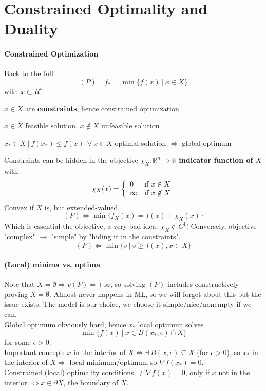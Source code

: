 \documentclass[10pt]{report}
\begin{document}
\section{Constrained Optimality and Duality}
\paragraph{Constrained Optimization} Back to the full $$(P)\:\:\:\:\:f_* = \min\{f(x)\:|\:x\in X\}$$ with $x\subset R^n$\begin{list}{}{}
	\item $x\in X$ are \textbf{constraints}, hence constrained optimization
	\item $x\in X$ feasible solution, $x\not\in X$ unfeasible solution
	\item $x_*\in X\:|\:f(x_*)\leq f(x)\:\:\forall\:x\in X$ optimal solution $\Leftrightarrow$ global optimum
\end{list}
Constraints can be hidden in the objective $\chi_X : \mathbb{R}^n\rightarrow \overline{\mathbb{R}}$ \textbf{indicator function of $X$} with $$\chi_X(x)=\left\{\begin{array}{l l}
0&\text{if }x\in X\\
\infty&\text{if }x\not\in X
\end{array}\right.$$ Convex if $X$ is, but extended-valued.
$$(P)\Leftrightarrow \min\{f_X(x)=f(x)+\chi_X(x)\}$$ Which is essential the objective, a very bad idea: $\chi_X\not\in C^1$! Conversely, objective "complex" $\rightarrow$ "simple" by "hiding it in the constraints".
$$(P)\Leftrightarrow\min\{v\:|\:v\geq f(x), x\in X\}$$
\paragraph{(Local) minima vs. optima} Note that $X=\emptyset\Rightarrow v(P) = +\infty$, so solving $(P)$ includes constructively proving $X=\emptyset$. Almost never happens in ML, so we will forget about this but the issue exists. The model is our choice, we choose it simple/nice/nonempty if we can.\\
Global optimum obviously hard, hence $x_*$ local optimum solves $$\min\{f(x)\:|\:x\in B(x_*,\epsilon)\cap X\}$$ for some $\epsilon>0$.\\
Important concept: $x$ in the interior of $X\Leftrightarrow\exists\:B(x,\epsilon)\subseteq X$ (for $\epsilon>0$), so $x_*$ in the interior of $X\Rightarrow$ local minimum/optimum so $\nabla f(x_*)=0$.\\
Constrained (local) optimality conditions $\neq\nabla f(x)=0$, only if $x$ not in the interior $\Leftrightarrow x\in \partial X$, the boundary of $X$.
\end{document}
